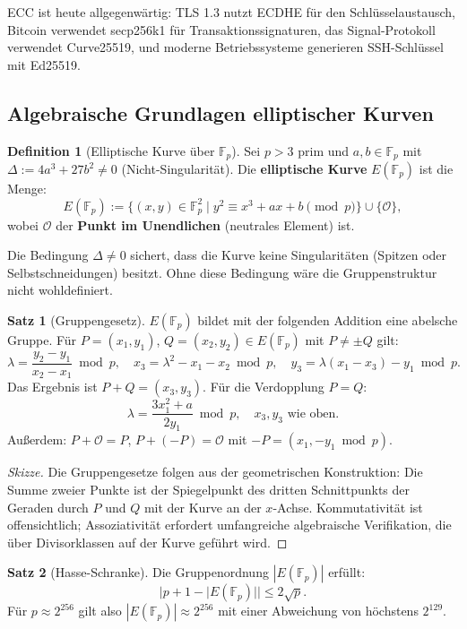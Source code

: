 ﻿\documentclass[a4paper,12pt]{scrreprt}
\theoremstyle{definition}
\newtheorem{definition}{Definition}[section]
\newtheorem{satz}{Satz}[section]
\begin{document}
ECC ist heute allgegenwärtig: TLS 1.3 \cite{Res18} nutzt ECDHE für den Schlüsselaustausch, Bitcoin \cite{Nak08} verwendet secp256k1 für Transaktionssignaturen, das Signal-Protokoll verwendet Curve25519, und moderne Betriebssysteme generieren SSH-Schlüssel mit Ed25519.

\subsection{Algebraische Grundlagen elliptischer Kurven}

\begin{definition}[Elliptische Kurve über $\mathbb{F}_p$]
Sei $p > 3$ prim und $a, b \in \mathbb{F}_p$ mit $\Delta := 4a^3 + 27b^2 \neq 0$ (Nicht-Singularität). Die \textbf{elliptische Kurve} $E(\mathbb{F}_p)$ ist die Menge:
\[
E(\mathbb{F}_p) := \{(x, y) \in \mathbb{F}_p^2 \mid y^2 \equiv x^3 + ax + b \pmod{p}\} \cup \{\mathcal{O}\},
\]
wobei $\mathcal{O}$ der \textbf{Punkt im Unendlichen} (neutrales Element) ist.
\end{definition}

Die Bedingung $\Delta \neq 0$ sichert, dass die Kurve keine Singularitäten (Spitzen oder Selbstschneidungen) besitzt. Ohne diese Bedingung wäre die Gruppenstruktur nicht wohldefiniert.

\begin{satz}[Gruppengesetz]
$E(\mathbb{F}_p)$ bildet mit der folgenden Addition eine abelsche Gruppe. Für $P = (x_1, y_1)$, $Q = (x_2, y_2) \in E(\mathbb{F}_p)$ mit $P \neq \pm Q$ gilt:
\[
\lambda = \frac{y_2 - y_1}{x_2 - x_1} \bmod p, \quad x_3 = \lambda^2 - x_1 - x_2 \bmod p, \quad y_3 = \lambda(x_1 - x_3) - y_1 \bmod p.
\]
Das Ergebnis ist $P + Q = (x_3, y_3)$. Für die Verdopplung $P = Q$:
\[
\lambda = \frac{3x_1^2 + a}{2y_1} \bmod p, \quad x_3, y_3 \text{ wie oben}.
\]
Außerdem: $P + \mathcal{O} = P$, $P + (-P) = \mathcal{O}$ mit $-P = (x_1, -y_1 \bmod p)$.
\end{satz}

\begin{proof}[Skizze]
Die Gruppengesetze folgen aus der geometrischen Konstruktion: Die Summe zweier Punkte ist der Spiegelpunkt des dritten Schnittpunkts der Geraden durch $P$ und $Q$ mit der Kurve an der $x$-Achse. Kommutativität ist offensichtlich; Assoziativität erfordert umfangreiche algebraische Verifikation, die über Divisorklassen auf der Kurve geführt wird.
\end{proof}

\begin{satz}[Hasse-Schranke]
Die Gruppenordnung $|E(\mathbb{F}_p)|$ erfüllt:
\[
|p + 1 - |E(\mathbb{F}_p)|| \leq 2\sqrt{p}.
\]
Für $p \approx 2^{256}$ gilt also $|E(\mathbb{F}_p)| \approx 2^{256}$ mit einer Abweichung von höchstens $2^{129}$.
\end{satz}
\end{document}
